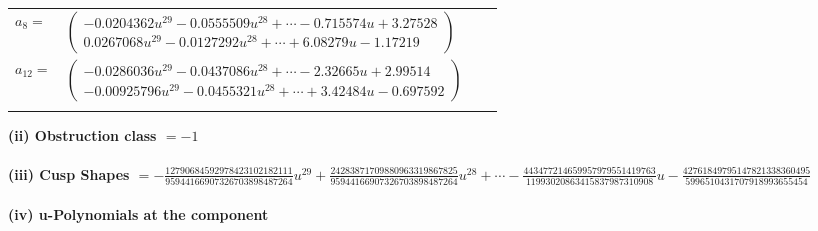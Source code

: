 \documentclass[1p]{elsarticle_modified}
\theoremstyle{definition}
\begin{document}
\begin{tabular}{m{7pt} m{180pt} m{7pt} m{180pt} }
\flushright $a_{8}=$&$\begin{pmatrix}-0.0204362 u^{29}-0.0555509 u^{28}+\cdots-0.715574 u+3.27528\\0.0267068 u^{29}-0.0127292 u^{28}+\cdots+6.08279 u-1.17219\end{pmatrix}$ \\
\flushright $a_{12}=$&$\begin{pmatrix}-0.0286036 u^{29}-0.0437086 u^{28}+\cdots-2.32665 u+2.99514\\-0.00925796 u^{29}-0.0455321 u^{28}+\cdots+3.42484 u-0.697592\end{pmatrix}$\\&\end{tabular}
\flushleft \textbf{(ii) Obstruction class $= -1$}\\~\\
\flushleft \textbf{(iii) Cusp Shapes $= -\frac{12790684592978423102182111}{95944166907326703898487264} u^{29}+\frac{24283871709880963319867825}{95944166907326703898487264} u^{28}+\cdots-\frac{443477214659957979551419763}{11993020863415837987310908} u-\frac{42761849795147821338360495}{5996510431707918993655454}$}\\~\\
\newpage\renewcommand{\arraystretch}{1}
\flushleft \textbf{(iv) u-Polynomials at the component}\newline \\
\end{document}
